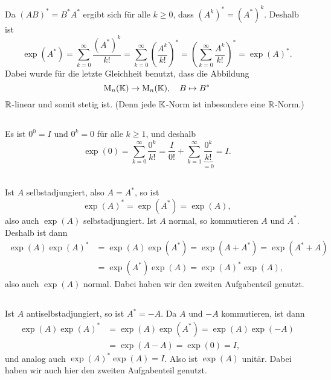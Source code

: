 \documentclass[a4paper, 10pt]{article}
\begin{document}
\subsection{}
Da $(AB)^* = B^* A^*$ ergibt sich für alle $k \geq 0$, dass $(A^k)^* = (A^*)^k$.
Deshalb ist
\[
    \exp(A^*)
  = \sum_{k=0}^\infty \frac{(A^*)^k}{k!}
  = \sum_{k=0}^\infty \left( \frac{A^k}{k!} \right)^*
  = \left( \sum_{k=0}^\infty \frac{A^k}{k!} \right)^*
  = \exp(A)^*.
\]
Dabei wurde für die letzte Gleichheit benutzt, dass die Abbildung
\[
  \operatorname{M}_n(\mathbb{K}) \to \operatorname{M}_n(\mathbb{K}),
  \quad
  B \mapsto B^*
\]
$\mathbb{R}$-linear und somit stetig ist.
(Denn jede $\mathbb{K}$-Norm ist inbesondere eine $\mathbb{R}$-Norm.)



\subsection{}
Es ist $0^0 = I$ und $0^k = 0$ für alle $k \geq 1$, und deshalb
\[
    \exp(0)
  = \sum_{k=0}^\infty \frac{0^k}{k!}
  = \frac{I}{0!} + \sum_{k=1}^\infty \underbrace{ \frac{0^k}{k!} }_{=0}
  = I.
\]





\subsection{}
Ist $A$ selbstadjungiert, also $A = A^*$, so ist
\[
  \exp(A)^* = \exp(A^*) = \exp(A),
\]
also auch $\exp(A)$ selbstadjungiert.
Ist $A$ normal, so kommutieren $A$ und $A^*$.
Deshalb ist dann
\begin{align*}
      \exp(A) \exp(A)^*
  &=  \exp(A) \exp(A^*) 
   =  \exp(A + A^*)
   =  \exp(A^* + A)     \\
  &=  \exp(A^*) \exp(A)
   =  \exp(A)^* \exp(A),
\end{align*}
also auch $\exp(A)$ normal.
Dabei haben wir den zweiten Aufgabenteil genutzt.





\subsection{}
Ist $A$ antiselbstadjungiert, so ist $A^* = -A$.
Da $A$ und $-A$ kommutieren, ist dann
\begin{align*}
      \exp(A) \exp(A)^*
  &=  \exp(A) \exp(A^*)
   =  \exp(A) \exp(-A)  \\
  &=  \exp(A-A)
   =  \exp(0)
   =  I,
\end{align*}
und analog auch $\exp(A)^* \exp(A) = I$.
Also ist $\exp(A)$ unitär.
Dabei haben wir auch hier den zweiten Aufgabenteil genutzt.
\end{document}
